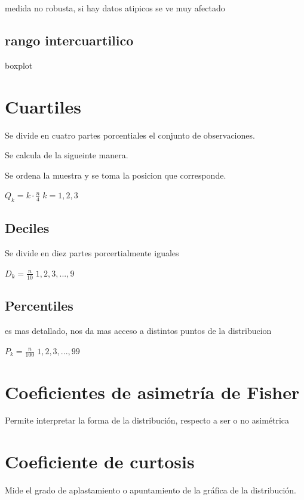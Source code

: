 \documentclass[twocolumn]{article}
\begin{document}
medida no robusta, si hay datos atipicos se ve muy afectado

\subsection{rango intercuartilico}\label{rango-intercuartilico}

boxplot

\section{Cuartiles}\label{cuartiles}

Se divide en cuatro partes porcentiales el conjunto de observaciones.

Se calcula de la sigueinte manera.

Se ordena la muestra y se toma la posicion que corresponde.

\(Q_k = k \cdot \frac{n}{4} \; k =1,2,3\)

\subsection{Deciles}\label{deciles}

Se divide en diez partes porcertialmente iguales

\(D_k = \frac{n}{10} \; 1,2,3,...,9\)

\subsection{Percentiles}\label{percentiles}

es mas detallado, nos da mas acceso a distintos puntos de la
distribucion

\(P_k = \frac{n}{100} \; 1,2,3,...,99\)

\section{Coeficientes de asimetría de
Fisher}\label{coeficientes-de-asimetruxeda-de-fisher}

Permite interpretar la forma de la distribución, respecto a ser o no
asimétrica

\section{Coeficiente de curtosis}\label{coeficiente-de-curtosis}

Mide el grado de aplastamiento o apuntamiento de la gráfica de la
distribución.
\end{document}
